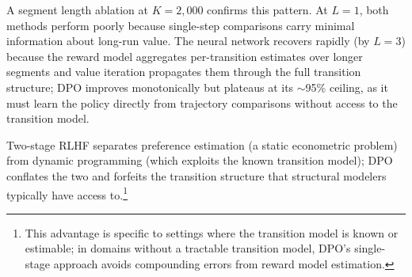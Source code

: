 A segment length ablation at $K = 2{,}000$ confirms this pattern. At $L = 1$, both methods perform poorly because single-step comparisons carry minimal information about long-run value. The neural network recovers rapidly (by $L = 3$) because the reward model aggregates per-transition estimates over longer segments and value iteration propagates them through the full transition structure; DPO improves monotonically but plateaus at its $\sim$95\% ceiling, as it must learn the policy directly from trajectory comparisons without access to the transition model.

Two-stage RLHF separates preference estimation (a static econometric problem) from dynamic programming (which exploits the known transition model); DPO conflates the two and forfeits the transition structure that structural modelers typically have access to.\footnote{This advantage is specific to settings where the transition model is known or estimable; in domains without a tractable transition model, DPO's single-stage approach avoids compounding errors from reward model estimation.}
